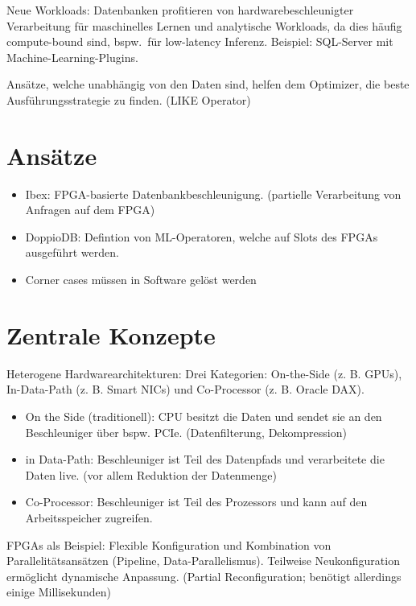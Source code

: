 \documentclass[10pt,a4paper]{article}
\begin{document}
Neue Workloads:
Datenbanken profitieren von hardwarebeschleunigter Verarbeitung für maschinelles Lernen und analytische Workloads, da dies
häufig compute-bound sind, bspw.\ für low-latency Inferenz.
Beispiel: SQL-Server mit Machine-Learning-Plugins.


Ansätze, welche unabhängig von den Daten sind, helfen dem Optimizer, die beste Ausführungsstrategie zu finden. (LIKE Operator)


\section{Ansätze}
\begin{itemize}
    \item Ibex: FPGA-basierte Datenbankbeschleunigung. (partielle Verarbeitung von Anfragen auf dem FPGA) 
    \item DoppioDB: Defintion von ML-Operatoren, welche auf Slots des FPGAs ausgeführt werden.
    \item Corner cases müssen in Software gelöst werden
\end{itemize}


\section{Zentrale Konzepte}

Heterogene Hardwarearchitekturen:
Drei Kategorien: On-the-Side (z. B. GPUs), In-Data-Path (z. B. Smart NICs) und Co-Processor (z. B. Oracle DAX).

\begin{itemize}
    \item On the Side (traditionell): CPU besitzt die Daten und sendet sie an den Beschleuniger über bspw. PCIe. (Datenfilterung, Dekompression)
    \item in Data-Path: Beschleuniger ist Teil des Datenpfads und verarbeitete die Daten live. (vor allem Reduktion der Datenmenge)
    \item Co-Processor: Beschleuniger ist Teil des Prozessors und kann auf den Arbeitsspeicher zugreifen.
\end{itemize}

FPGAs als Beispiel:
Flexible Konfiguration und Kombination von Parallelitätsansätzen (Pipeline, Data-Parallelismus).
Teilweise Neukonfiguration ermöglicht dynamische Anpassung. (Partial Reconfiguration; benötigt allerdings einige Millisekunden)
\end{document}
